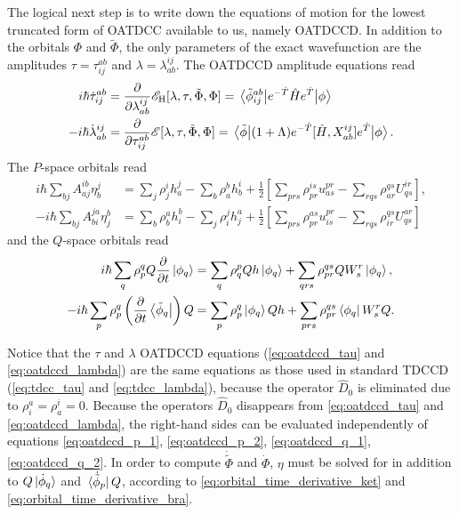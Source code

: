 The logical next step is to write down the equations of motion for the lowest 
truncated form of OATDCC available to us, namely OATDCCD. In addition to the 
orbitals $\Phi$ and $\tilde{\Phi}$, the only parameters of the exact wavefunction 
are the amplitudes $\tau = \tau^{ab}_{ij}$ and $\lambda = \lambda^{ij}_{ab}$. 
The OATDCCD amplitude equations read 
\begin{align}
    \label{eq:oatdccd_tau}
    i\hbar \dot{\tau}^{ab}_{ij} 
        &= \frac{\partial}{\partial \lambda^{ij}_{ab}}
            \mathscr{E}_{\text{H}}[\lambda, \tau, \tilde{\Phi}, \Phi]
        = \mel{\tilde{\phi}^{ab}_{ij}}
            {e^{-\hat{T}}\hat{H}e^{\hat{T}}}
        {\phi} \\
    \label{eq:oatdccd_lambda}
    -i\hbar\dot{\lambda}^{ij}_{ab}
        &= \frac{\partial}{\partial \tau^{ab}_{ij}}
            \mathscr{E}[\lambda, \tau, \tilde{\Phi}, \Phi]
        = \mel{\tilde{\phi}}
            {(1 + \Lambda)e^{-\hat{T}}[\hat{H}, X^{ij}_{ab}]e^{\hat{T}}}
            {\phi}.
\end{align}
The $P$-space orbitals read 
\begin{align}
    \label{eq:oatdccd_p_1}
    i\hbar\sum_{bj}A^{ib}_{aj} \eta^j_b
        &= \sum_j \rho^i_j h^j_a - \sum_b \rho^b_a h^i_b
        + \frac{1}{2}\left[
             \sum_{prs}\rho^{is}_{pr} u^{pr}_{as}
            -\sum_{rqs}\rho^{qs}_{ar} U^{ir}_{qs}
        \right], \\
    \label{eq:oatdccd_p_2}
    -i\hbar\sum_{bj}A^{ja}_{bi} \eta^b_j
        &= \sum_b \rho^a_b h^b_i - \sum_j \rho^j_i h^a_j
        + \frac{1}{2}\left[
             \sum_{prs}\rho^{as}_{pr} u^{pr}_{is}
            -\sum_{rqs}\rho^{qs}_{ir} U^{ar}_{qs}       
        \right]
\end{align}
and the $Q$-space orbitals read
\begin{align}
    \label{eq:oatdccd_q_1}
    i\hbar\sum_q \rho^q_p Q \frac{\partial}{\partial t} \ket{\phi_q}
        &= \sum_q \rho^p_q Q h\ket{\phi_q} 
            + \sum_{qrs} \rho^{qs}_{pr} Q W^r_s \ket{\phi_q}, \\
    \label{eq:oatdccd_q_2}
    -i\hbar\sum_p \rho^q_p
    \left(\frac{\partial}{\partial t} \bra{\tilde{\phi}_q}\right)Q
        &= \sum_p \rho^q_p \ket{\phi_q} Q h
            + \sum_{prs} \rho^{qs}_{pr}\bra{\phi_q} W^r_s Q.
\end{align}

Notice that the $\tau$ and $\lambda$ OATDCCD equations
(\autoref{eq:oatdccd_tau} and \autoref{eq:oatdccd_lambda}) are the 
same equations as those used in standard TDCCD
(\autoref{eq:tdcc_tau} and \autoref{eq:tdcc_lambda}), because the 
operator $\hat{D}_0$ is eliminated due to $\rho^a_i = \rho^i_a = 0$.
Because the operators $\hat{D}_0$ disappears from 
\autoref{eq:oatdccd_tau} and \autoref{eq:oatdccd_lambda},
the right-hand sides can be evaluated independently of 
equations \ref{eq:oatdccd_p_1}, \ref{eq:oatdccd_p_2},
\ref{eq:oatdccd_q_1}, \ref{eq:oatdccd_q_2}. In order to compute 
$\dot{\tilde{\Phi}}$ and $\dot{\Phi}$, $\eta$ must be solved for in 
addition to $Q\ket*{\dot{\phi}_q}$ and $\bra*{\dot{\tilde{\phi}}_p}Q$,
according to \autoref{eq:orbital_time_derivative_ket} and 
\autoref{eq:orbital_time_derivative_bra}.

\clearemptydoublepage